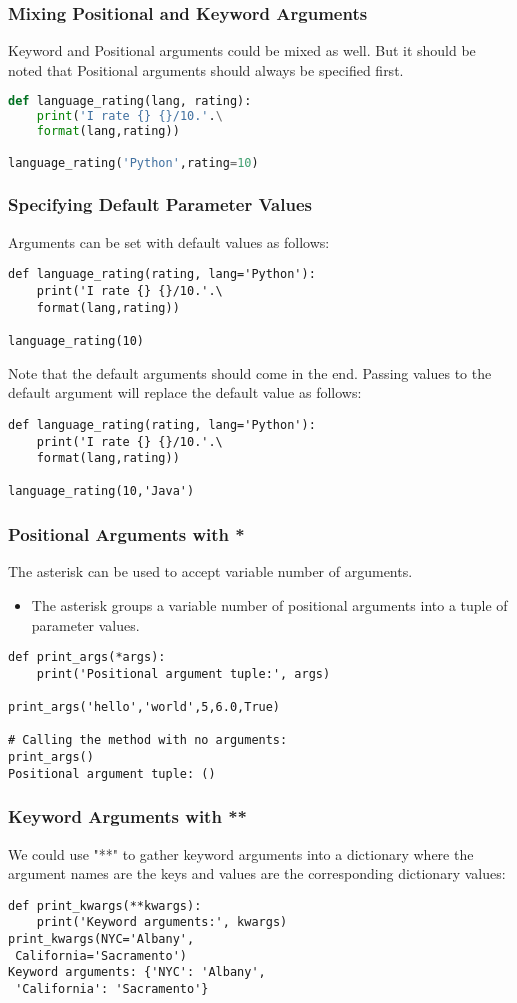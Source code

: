 \documentclass{beamer}
\begin{document}
\begin{frame}[fragile]
\frametitle{Mixing Positional and Keyword Arguments}
Keyword and Positional arguments could be mixed as well. But it should be noted that Positional arguments should always be specified first.
\begin{lstlisting}[language=Python]
def language_rating(lang, rating):
	print('I rate {} {}/10.'.\
	format(lang,rating))

language_rating('Python',rating=10)
\end{lstlisting}
\end{frame}

\begin{frame}[fragile]
\frametitle{Specifying Default Parameter Values}
Arguments can be set with default values as follows:

\begin{lstlisting}
def language_rating(rating, lang='Python'):
	print('I rate {} {}/10.'.\
	format(lang,rating))

language_rating(10)
\end{lstlisting}
Note that the default arguments should come in the end.
Passing values to the default argument will replace the default value as follows:
\begin{lstlisting}
def language_rating(rating, lang='Python'):
	print('I rate {} {}/10.'.\
	format(lang,rating))

language_rating(10,'Java')
\end{lstlisting}
\end{frame}


\begin{frame}[fragile]
\frametitle{Positional Arguments with *}
The asterisk can be used to accept variable number of arguments.
\begin{itemize}
\item The asterisk groups a variable number of positional arguments into a tuple of parameter values.
\end{itemize}
\begin{lstlisting}
def print_args(*args):
    print('Positional argument tuple:', args)

print_args('hello','world',5,6.0,True)

# Calling the method with no arguments:
print_args()
Positional argument tuple: ()
\end{lstlisting}
\end{frame}

\begin{frame}[fragile]
\frametitle{Keyword Arguments with **}
We could use "**" to gather keyword arguments into a dictionary where the argument names are the keys and values are the corresponding dictionary values:

\begin{lstlisting}
def print_kwargs(**kwargs):
    print('Keyword arguments:', kwargs)
print_kwargs(NYC='Albany',
 California='Sacramento')
Keyword arguments: {'NYC': 'Albany',
 'California': 'Sacramento'}
\end{lstlisting}
\end{frame}
\end{document}
